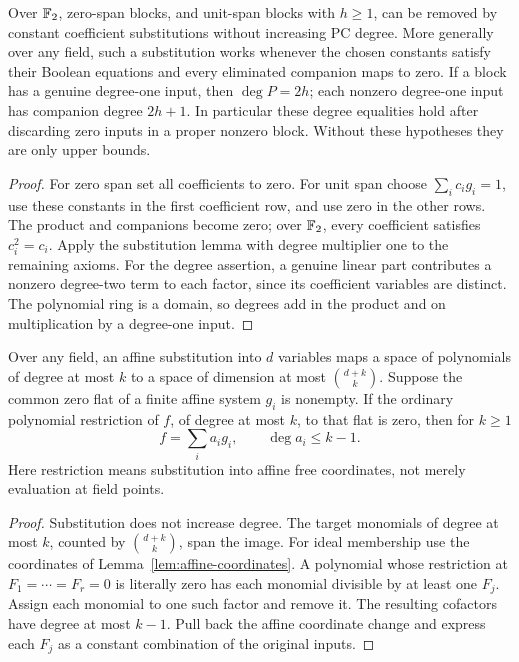\begin{lemma}\label{lem:cleanup}
Over \(\mathbb F_2\), zero-span blocks, and unit-span blocks with \(h\ge1\), can
be removed by constant coefficient substitutions without increasing PC degree.
More generally over any field, such a substitution works whenever the chosen
constants satisfy their Boolean equations and every eliminated companion
maps to zero. If a block has a genuine degree-one input, then
\(\deg P=2h\); each nonzero degree-one input has companion degree \(2h+1\).
In particular these degree equalities hold after discarding zero inputs in
a proper nonzero block. Without these hypotheses they are only upper bounds.
\end{lemma}
\begin{proof}
For zero span set all coefficients to zero. For unit span choose
\(\sum_i c_i g_i=1\), use these constants in the first coefficient row,
and use zero in the other rows. The product and companions become zero;
over \(\mathbb F_2\), every coefficient satisfies \(c_i^2=c_i\).
Apply the substitution lemma with degree multiplier one to the remaining
axioms. For the degree assertion, a genuine linear part contributes a
nonzero degree-two term to each factor, since its coefficient variables
are distinct. The polynomial ring is a domain, so degrees add in the
product and on multiplication by a degree-one input.
\end{proof}

\begin{lemma}
\label{lem:restriction-ideal}
Over any field, an affine substitution into \(d\) variables maps a space
of polynomials of degree at most \(k\) to a space of dimension at most
\(\binom{d+k}{k}\). Suppose the common zero flat of a finite affine
system \(g_i\) is nonempty. If the ordinary polynomial restriction of
\(f\), of degree at most \(k\), to that flat is zero, then for \(k\ge1\)
\begin{equation}\label{eq:literal-ideal}
 f=\sum_i a_i g_i,\qquad \deg a_i\le k-1.
\end{equation}
Here restriction means substitution into affine free coordinates, not
merely evaluation at field points.
\end{lemma}
\begin{proof}
Substitution does not increase degree. The target monomials of degree at
most \(k\), counted by \(\binom{d+k}{k}\), span the image.
For ideal membership use the coordinates of Lemma~\ref{lem:affine-coordinates}.
A polynomial whose restriction at \(F_1=\cdots=F_r=0\) is literally zero
has each monomial divisible by at least one \(F_j\). Assign each monomial
to one such factor and remove it. The resulting cofactors have degree at
most \(k-1\). Pull back the affine coordinate change and express each
\(F_j\) as a constant combination of the original inputs.
\end{proof}

